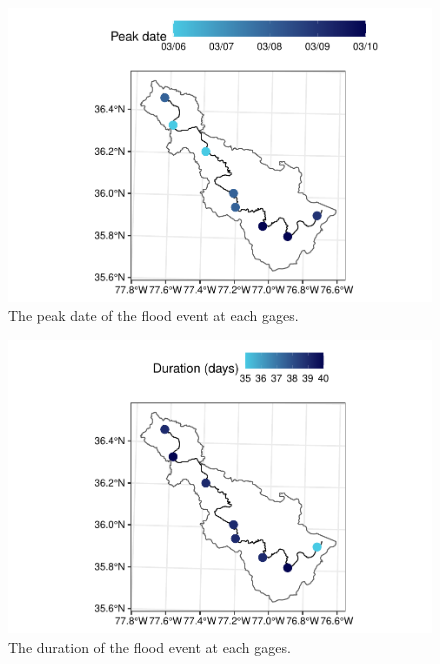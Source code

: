 \documentclass[12pt,]{article}
\begin{document}
\begin{figure}
\centering
\includegraphics{Zeng_WDA_Project_files/figure-latex/Figure 5-1.pdf}
\caption{The peak date of the flood event at each gages.}
\end{figure}

\begin{figure}
\centering
\includegraphics{Zeng_WDA_Project_files/figure-latex/Figure 6-1.pdf}
\caption{The duration of the flood event at each gages.}
\end{figure}
\end{document}
